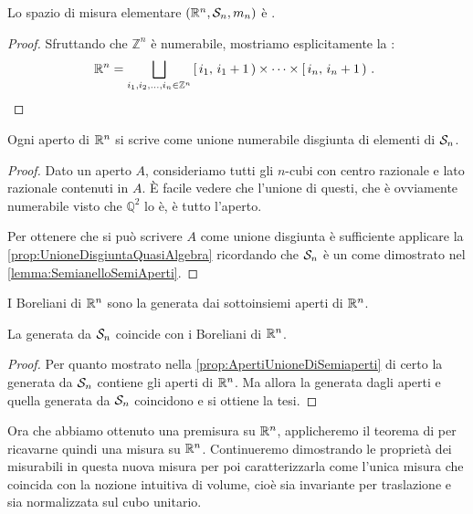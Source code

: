 \begin{proposition}\label{prop:LebesguePremisuraSigFin}
	Lo spazio di misura elementare $(\R^n,\S_n,m_n)$ è \sigfin[o].
\end{proposition}
\begin{proof}
	Sfruttando che $\mathbb Z^n$ è numerabile, mostriamo esplicitamente la \sigfin[ezza]:
	\begin{equation*}
		\R^n=\bigsqcup_{i_1,i_2,\dots,i_n\in\mathbb Z^n} \co{i_1}{i_1+1}\times\cdots \times\co{i_n}{i_n+1} \punto
	\end{equation*}
	
\end{proof}

\begin{proposition}\label{prop:ApertiUnioneDiSemiaperti}
	Ogni aperto di $\R^n$ si scrive come unione numerabile disgiunta di elementi di $\S_n$.
\end{proposition}
\begin{proof}
	Dato un aperto $A$, consideriamo tutti gli $n$-cubi con centro razionale e lato razionale contenuti in $A$.
	È facile vedere che l'unione di questi, che è ovviamente numerabile visto che $\mathbb Q^2$ lo è, è tutto l'aperto.
	
	Per ottenere che si può scrivere $A$ come unione disgiunta è sufficiente applicare la \cref{prop:UnioneDisgiuntaQuasiAlgebra} ricordando che $\S_n$ è un \semiring{} come dimostrato nel \cref{lemma:SemianelloSemiAperti}.
\end{proof}

\begin{definition}\label{def:Boreliani}
	I Boreliani di $\R^n$ sono la \sigalg{} generata dai sottoinsiemi aperti di $\R^n$.
\end{definition}

\begin{proposition}\label{prop:SigAlgUgualeBoreliani}
	La \sigalg{} generata da $\S_n$ coincide con i Boreliani di $\R^n$.
\end{proposition}
\begin{proof}
	Per quanto mostrato nella \cref{prop:ApertiUnioneDiSemiaperti} di certo la \sigalg{} generata da $\S_n$ contiene gli aperti di $\R^n$.
	Ma allora la \sigalg{} generata dagli aperti e quella generata da $\S_n$ coincidono e si ottiene la tesi.
\end{proof}

Ora che abbiamo ottenuto una premisura su $\R^n$, applicheremo il teorema di \carat{} per ricavarne quindi una misura su $\R^n$. 
Continueremo dimostrando le proprietà dei misurabili in questa nuova misura per poi caratterizzarla come l'unica misura che coincida con la nozione intuitiva di volume, cioè sia invariante per traslazione e sia normalizzata sul cubo unitario.

